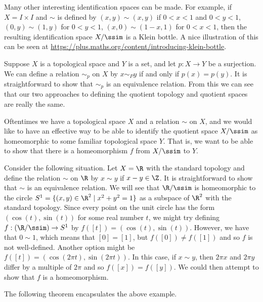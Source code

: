 \ea


Many other interesting identification spaces can be made. For example, if $X = I \times I$ and $\sim$ is defined by $(x, y) \sim (x,y)$ if $0 < x < 1$ and $0 < y < 1$, $(0, y) \sim (1, y)$ for $0 < y < 1$, $(x,0) \sim (1-x,1)$ for $0 < x < 1$, then the resulting identification space $X/\ssim$ is a Klein bottle. A nice illustration of this can be seen at 
\url{https://plus.maths.org/content/introducing-klein-bottle}.


Suppose $X$ is a topological space and $Y$ is a set, and let $p: X \to Y$ be a surjection. We can define a relation $\sim_p$ on $X$ by $x \sim_P y$ if and only if $p(x) = p(y)$. It is straightforward to show that $\sim_p$ is an equivalence relation. From this we can see that our two approaches to defining the quotient topology and quotient spaces are really the same. 

Oftentimes we have a topological space $X$ and a relation $\sim$ on $X$, and we would like to have an effective way to be able to identify the quotient space $X/\ssim$ as homeomorphic to some familiar topological space $Y$. That is, we want to be able to show that there is a homeomorphism $f$ from $X/\ssim$ to $Y$. 

\begin{example} Consider the following situation. Let $X = \R$ with the standard topology and define the relation $\sim$ on $\R$ by $x \sim y$ if $x - y \in \Z$. It is straightforward to show that $\sim$ is an equivalence relation. We will see that $\R/\ssim$ is homeomorphic to the circle $S^1 = \{(x,y) \in \R^2 \mid x^2+y^2 = 1\}$ as a subspace of $\R^2$ with the standard topology. Since every point on the unit circle has the form $(\cos(t), \sin(t))$ for some real number $t$, we might try defining $f: (\R/\ssim) \to S^1$ by $f([t]) = (\cos(t), \sin(t))$. However, we have that $0 \sim 1$, which means that $[0] = [1]$, but $f([0]) \neq f([1])$ and so $f$ is not well-defined. Another option might be $f([t]) = (\cos(2 \pi t), \sin(2 \pi t))$. In this case, if $x \sim y$, then $2 \pi x$ and $2 \pi y$ differ by a multiple of $2 \pi$ and so $f([x]) = f([y])$. We could then attempt to show that $f$ is a homeomorphism. 

\end{example}

The following theorem encapsulates the above example.

